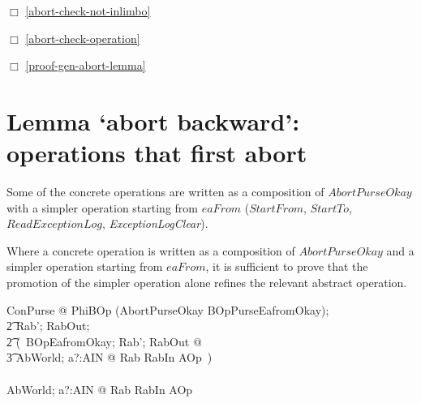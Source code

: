 $\Box$ \ref{abort-check-not-inlimbo}

$\Box$ \ref{abort-check-operation}

$\Box$ \ref{proof-gen-abort-lemma}
\section{Lemma `abort backward': operations that first abort}
\label{ignore-abort-op}
Some of the concrete operations are written as a composition of
$AbortPurseOkay$ with a simpler operation starting from
$eaFrom$ ($StartFrom$, $StartTo$, $ReadExceptionLog$,
{\it
  ExceptionLogClear}).

  {\rm Where a concrete operation is written as a composition of
    $AbortPurseOkay$ and a simpler operation starting from $eaFrom$,
    it is sufficient to prove that the promotion of the simpler
    operation alone refines the relevant abstract operation.  }
  \begin{gzed}
  \exists \Delta ConPurse @ PhiBOp \land (AbortPurseOkay \semi
  BOpPurseEafromOkay);
  \\ %
  \t2 Rab'; RabOut;
  \\ %
  \t2 (~\forall BOpEafromOkay; Rab'; RabOut @
  \\ %
 \t3 \exists AbWorld; a?:AIN @ Rab \land RabIn \land AOp~)
 \\ %
 \shows
 \\ %
 \exists AbWorld; a?:AIN @ Rab \land RabIn \land AOp
 \end{gzed}

